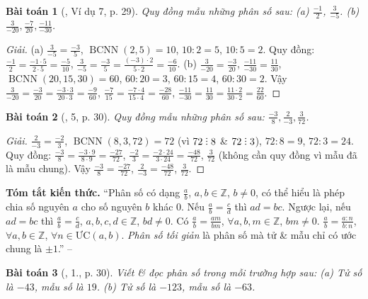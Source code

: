 \documentclass{article}
\newtheorem{baitoan}{Bài toán}
\DeclareRobustCommand{\divby}{%
	\mathrel{\vbox{\baselineskip.65ex\lineskiplimit0pt\hbox{.}\hbox{.}\hbox{.}}}%
}
\begin{document}
\begin{baitoan}[\cite{SGK_Toan_6_Canh_Dieu_tap_2}, Ví dụ 7, p. 29]
	Quy đồng mẫu những phân số sau: (a) $\frac{-1}{2}$, $\frac{3}{-5}$. (b) $\frac{3}{-20},\frac{-7}{20},\frac{-11}{-30}$.
\end{baitoan}

\begin{proof}[Giải]
	(a) $\frac{3}{-5} = \frac{-3}{5}$, $\operatorname{BCNN}(2,5) = 10$, $10:2 = 5$, $10:5 = 2$. Quy đồng: $\frac{-1}{2} = \frac{-1\cdot5}{2\cdot5} = \frac{-5}{10}$, $\frac{3}{-5} = \frac{-3}{5} = \frac{(-3)\cdot2}{5\cdot2} = \frac{-6}{10}$. (b) $\frac{3}{-20} = \frac{-3}{20}$, $\frac{-11}{-30} = \frac{11}{30}$, $\operatorname{BCNN}(20,15,30) = 60$, $60:20 = 3$, $60:15 = 4$, $60:30 = 2$. Vậy $\frac{3}{-20} = \frac{-3}{20} = \frac{-3\cdot3}{20\cdot3} = \frac{-9}{60}$, $\frac{-7}{15} = \frac{-7\cdot4}{15\cdot4} = \frac{-28}{60}$, $\frac{-11}{-30} = \frac{11}{30} = \frac{11\cdot2}{30\cdot2} = \frac{22}{60}$.
\end{proof}

\begin{baitoan}[\cite{SGK_Toan_6_Canh_Dieu_tap_2}, 5, p. 30]
	Quy đồng mẫu những phân số sau: $\frac{-3}{8},\frac{2}{-3},\frac{3}{72}$.
\end{baitoan}

\begin{proof}[Giải]
	$\frac{2}{-3} = \frac{-2}{3}$, $\operatorname{BCNN}(8,3,72) = 72$ (vì $72\divby8$ \& $72\divby 3$), $72:8 = 9$, $72:3 = 24$. Quy đồng: $\frac{-3}{8} = \frac{-3\cdot9}{8\cdot9} = \frac{-27}{72}$, $\frac{-2}{3} = \frac{-2\cdot24}{3\cdot24} = \frac{-48}{72}$, $\frac{3}{72}$ (không cần quy đồng vì mẫu đã là mẫu chung). Vậy $\frac{-3}{8} = \frac{-27}{72}$, $\frac{2}{-3} = \frac{-48}{72}$, $\frac{3}{72}$.
\end{proof}
\noindent\textsf{\textbf{Tóm tắt kiến thức.}} ``Phân số có dạng $\frac{a}{b}$, $a,b\in\mathbb{Z}$, $b\ne0$, có thể hiểu là phép chia số nguyên $a$ cho số nguyên $b$ khác $0$. Nếu $\frac{a}{b} = \frac{c}{d}$ thì $ad = bc$. Ngược lại, nếu $ad = bc$ thì $\frac{a}{b} = \frac{c}{d}$, $a,b,c,d\in\mathbb{Z}$, $bd\ne0$. Có $\frac{a}{b} = \frac{am}{bm}$, $\forall a,b,m\in\mathbb{Z}$, $bm\ne0$. $\frac{a}{b} = \frac{a:n}{b:n}$, $\forall a,b\in\mathbb{Z}$, $\forall n\in\mbox{ƯC}(a,b)$. \textit{Phân số tối giản} là phân số mà tử \& mẫu chỉ có ước chung là $\pm1$.'' -- \cite[Chap. V, \S1, p. 29]{SBT_Toan_6_Canh_Dieu_tap_2}

\begin{baitoan}[\cite{SGK_Toan_6_Canh_Dieu_tap_2}, 1., p. 30]
	Viết \& đọc phân số trong mỗi trường hợp sau: (a) Tử số là $-43$, mẫu số là $19$. (b) Tử số là $-123$, mẫu số là $-63$.
\end{baitoan}
\end{document}
